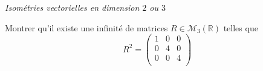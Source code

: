 \documentclass[a4paper,10pt]{report}
\begin{document}


\newpage

\begin{center}
\textit{{ {\large Isométries vectorielles en dimension $2$ ou $3$}}}
\end{center}

\medskip

\begin{Exa} Montrer qu'il existe une infinité de matrices $R \in \mathcal{M}_3(\mathbb{R})$ telles que
$$  R^2 = \begin{pmatrix}
1 & 0 & 0 \\
0 & 4 & 0 \\
0 & 0 & 4 \\
\end{pmatrix}$$
\end{Exa}

\end{document}
